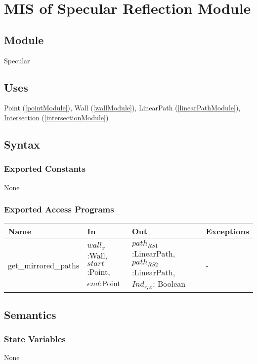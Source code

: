 \documentclass[12pt, titlepage]{article}
\begin{document}
\newpage
\section{MIS of Specular Reflection Module} \label{specularReflection}

\subsection{Module}

Specular

\subsection{Uses}
Point (\autoref{pointModule}), Wall (\autoref{wallModule}), LinearPath (\autoref{linearPathModule}),  Intersection (\autoref{intersectionModule})

\subsection{Syntax}

\subsubsection{Exported Constants} None

\subsubsection{Exported Access Programs}

\begin{center}
\begin{tabular}{p{4cm} p{2cm} p{4cm} p{2cm}}
\hline
\textbf{Name} & \textbf{In} & \textbf{Out} & \textbf{Exceptions} \\
\hline
get\_mirrored\_paths & $wall_x$:Wall, $start$:Point, $end$:Point & $path_{RS1}$:LinearPath, $path_{RS2}$:LinearPath, $Ind_{r,x}$: Boolean & - \\

\hline
\end{tabular}
\end{center}

\subsection{Semantics}

\subsubsection{State Variables} None
\end{document}
